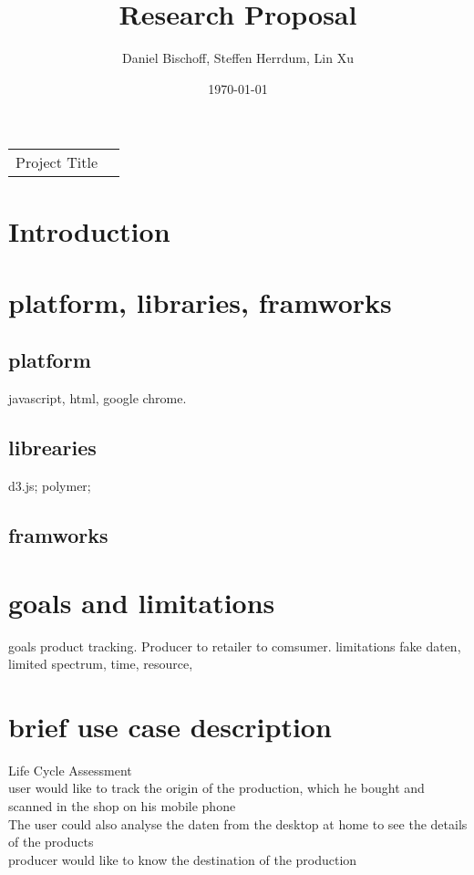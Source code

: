 \documentclass[a4page]{article}
\author{Daniel Bischoff, Steffen Herrdum, Lin Xu 
}
\title{Research Proposal 
}
\date{\today}
\begin{document}
\maketitle

\begin{table}[!th]
\begin{tabular}{l p{}}

Project Title &  \\

\end{tabular}
\end{table}

\section{Introduction}

\section{platform, libraries, framworks}
\subsection{platform}
	javascript, html, google chrome. 
\subsection{librearies}
	d3.js; polymer; 
\subsection{framworks}
	
\section{goals and limitations}

goals  product tracking. Producer to retailer to comsumer. 
limitations  fake daten, limited spectrum, time, resource, 

\section{brief use case description}
Life Cycle Assessment\\
user would like to track the origin of the production, which he bought and scanned in the shop on his mobile phone\\
The user could also analyse the daten from the desktop at home to see the details of the products\\
producer would like to know the destination of the production\\
\end{document}
